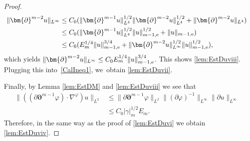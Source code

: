 \documentclass[JEP,XML,SOM,Unicode,NoFloatCountersInSection,published]{cedram}
\theoremstyle{definition}
\begin{document}
\begin{proof}
\begin{align*}
\|\bm{\partial}^{m-2} u\|_{L^\infty}
&\leq C_0 (\|\bm{\partial}^{m-1} u\|_{L^4}^{1/2} \|\bm{\partial}^{m-2} u\|_{L^4}^{1/2} + \|\bm{\partial}^{m-2} u\|_{L^4}) \\
&\leq C_0 (\|\bm{\partial}^{m-1} u\|_{L^4}^{1/2} \|u\|_{m-1,{\rm e}}^{1/2} + \|u\|_{m-1,{\rm e}}) \\
&\leq C_0 (E_m^{1/4}\|u\|_{m-1,{\rm e}}^{3/4} + \|\bm{\partial}^{m-2}u\|_{L^\infty}^{1/2}\|u\|_{m-1,{\rm e}}^{1/2}),
\end{align*}
which yields $\|\bm{\partial}^{m-2} u\|_{L^\infty} \leq C_0E_m^{1/4}\|u\|_{m-1,{\rm e}}^{3/4}$.
This shows \eqref{lem:EstDuviii}.
Plugging this into~\eqref{CalIneq1}, we~obtain \eqref{lem:EstDuvii}.

Finally, by Lemma \ref{lem:EstDM} and \eqref{lem:EstDuviii} we see that
\begin{align*}
\|((\partial\bm{\partial}^{m-1}\varphi)\cdot\nabla^\varphi)u\|_{L^2}
&\leq \|\partial\bm{\partial}^{m-1}\varphi\|_{L^2} \|(\partial\varphi)^{-1}\|_{L^\infty} \|\partial u\|_{L^\infty} \\
&\leq C_0|\gamma|_m^{1/2}E_m.
\end{align*}
Therefore, in the same way as the proof of \eqref{lem:EstDuvi} we obtain \eqref{lem:EstDuviv}.
\end{proof}
\end{document}
